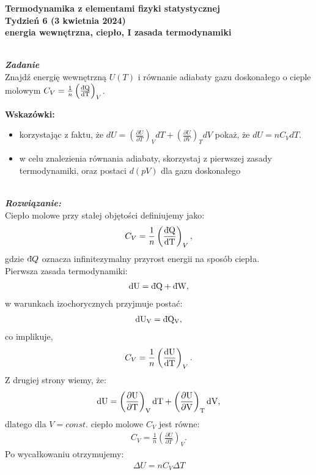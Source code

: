 \documentclass[11pt,a4paper]{article}
\newcounter{zadanie}\newcommand{\zadanie}[1][]{\addtocounter{zadanie}{1} ~\\  {\bf \emph{Zadanie \arabic{zadanie} #1 }} \\}
\newcounter{rozwiazanie}\newcommand{\rozwiazanie}[1][]{\addtocounter{rozwiazanie}{1} ~\\  {\bf \emph{Rozwiązanie: }} \\}
\newcommand{\dbar}{{\mkern3mu\mathchar'26\mkern-12mu d}}
\begin{document}

\begin{centering}
\bf{\Large{Termodynamika z elementami fizyki statystycznej}}\\
Tydzień 6  (3 kwietnia 2024)\\[3mm]
energia wewnętrzna, ciepło, I zasada termodynamiki \\ 
\end{centering} 
\vspace{5mm}

\zadanie

Znajdź energię wewnętrzną $U(T)$ i równanie adiabaty gazu doskonałego o cieple molowym
$C_V = \frac{1}{n}\left( \frac{\rm{\dbar}Q}{\rm{d}T}\right)_V$.

\textbf{Wskazówki:}
\begin{itemize}
  \item korzystając z faktu, że
    $dU = \left(\frac{\partial U}{\partial T}\right)_V dT + \left(\frac{\partial U}{\partial V}\right)_T dV$
    pokaż, że $dU = n C_V dT$.
  \item w celu znalezienia równania adiabaty, skorzystaj z pierwszej zasady termodynamiki,
    oraz postaci $d(pV)$ dla gazu doskonałego\\
\end{itemize}


\vspace{5mm}
\rozwiazanie
Ciepło molowe przy stałej objętości definiujemy jako:
\begin{align}
C_V = \frac{1}{n}\left( \frac{\rm{\dbar}Q}{\rm{d}T}\right)_V,
\end{align}
gdzie ${\rm \dbar} Q$ oznacza infinitezymalny przyrost energii na sposób ciepła. \\
Pierwsza zasada termodynamiki:
\begin{align}
\rm{d}U = \rm{\dbar}Q + \rm{\dbar}W,
\end{align}
w warunkach izochorycznych przyjmuje postać:
\begin{align}
\rm{d}U_V = \rm{\dbar}Q _V, 
\end{align}
co implikuje,
\begin{align}
C_V = \frac{1}{n}\left( \frac{\rm{d}U}{\rm{d}T}\right)_V.
\end{align}
Z drugiej strony wiemy, że:
\begin{align*}
\rm{d}U = \left(\frac{\partial U}{\partial T} \right)_V \rm{d}T +  \left(\frac{\partial U}{\partial V} \right)_T \rm{d}V,
\end{align*}
dlatego dla $V=const.$ ciepło molowe $C_V$ jest równe:
\begin{align}
C_V = \frac{1}{n}\left( \frac{\partial U}{\partial T} \right)_V.
\end{align}
Po wycałkowaniu otrzymujemy:
\begin{align}
\Delta U = n C_V \Delta T 
\end{align}
\end{document}
